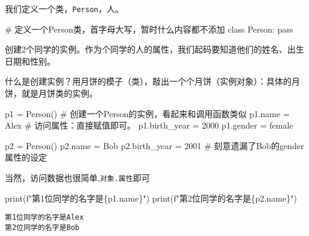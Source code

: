 \documentclass[
  letterpaper,
  DIV=11,
  numbers=noendperiod]{scrreprt}
\newenvironment{Shaded}{\begin{snugshade}}{\end{snugshade}}
\newcommand{\BuiltInTok}[1]{\textcolor[rgb]{0.00,0.23,0.31}{#1}}
\newcommand{\CommentTok}[1]{\textcolor[rgb]{0.37,0.37,0.37}{#1}}
\newcommand{\ControlFlowTok}[1]{\textcolor[rgb]{0.00,0.23,0.31}{#1}}
\newcommand{\KeywordTok}[1]{\textcolor[rgb]{0.00,0.23,0.31}{#1}}
\newcommand{\NormalTok}[1]{\textcolor[rgb]{0.00,0.23,0.31}{#1}}
\newcommand{\OperatorTok}[1]{\textcolor[rgb]{0.37,0.37,0.37}{#1}}
\newcommand{\SpecialCharTok}[1]{\textcolor[rgb]{0.37,0.37,0.37}{#1}}
\newcommand{\SpecialStringTok}[1]{\textcolor[rgb]{0.13,0.47,0.30}{#1}}
\newcommand{\StringTok}[1]{\textcolor[rgb]{0.13,0.47,0.30}{#1}}
\begin{document}
我们定义一个类，\texttt{Person}，人。

\begin{Shaded}
\begin{Highlighting}[]
\CommentTok{\# 定义一个Person类，首字母大写，暂时什么内容都不添加}
\KeywordTok{class}\NormalTok{ Person:}
    \ControlFlowTok{pass}
\end{Highlighting}
\end{Shaded}

创建2个同学的实例。作为个同学的人的属性，我们起码要知道他们的姓名、出生日期和性别。

什么是创建实例？用月饼的模子（类），敲出一个个月饼（实例对象）：具体的月饼，就是月饼类的实例。

\begin{Shaded}
\begin{Highlighting}[]
\NormalTok{p1 }\OperatorTok{=}\NormalTok{ Person() }\CommentTok{\# 创建一个Person的实例，看起来和调用函数类似}
\NormalTok{p1.name }\OperatorTok{=} \StringTok{\textquotesingle{}Alex\textquotesingle{}}  \CommentTok{\# 访问属性：直接赋值即可。}
\NormalTok{p1.birth\_year }\OperatorTok{=} \StringTok{\textquotesingle{}2000\textquotesingle{}}
\NormalTok{p1.gender }\OperatorTok{=} \StringTok{\textquotesingle{}female\textquotesingle{}}

\NormalTok{p2 }\OperatorTok{=}\NormalTok{ Person() }
\NormalTok{p2.name }\OperatorTok{=} \StringTok{\textquotesingle{}Bob\textquotesingle{}}  
\NormalTok{p2.birth\_year }\OperatorTok{=} \StringTok{\textquotesingle{}2001\textquotesingle{}}
\CommentTok{\# 刻意遗漏了Bob的gender属性的设定}
\end{Highlighting}
\end{Shaded}

当然，访问数据也很简单,\texttt{对象.属性}即可

\begin{Shaded}
\begin{Highlighting}[]
\BuiltInTok{print}\NormalTok{(}\SpecialStringTok{f"第1位同学的名字是}\SpecialCharTok{\{}\NormalTok{p1}\SpecialCharTok{.}\NormalTok{name}\SpecialCharTok{\}}\SpecialStringTok{"}\NormalTok{)}
\BuiltInTok{print}\NormalTok{(}\SpecialStringTok{f"第2位同学的名字是}\SpecialCharTok{\{}\NormalTok{p2}\SpecialCharTok{.}\NormalTok{name}\SpecialCharTok{\}}\SpecialStringTok{"}\NormalTok{)}
\end{Highlighting}
\end{Shaded}

\begin{verbatim}
第1位同学的名字是Alex
第2位同学的名字是Bob
\end{verbatim}
\end{document}
